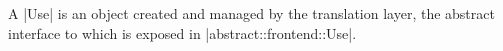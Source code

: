A |Use| is an object created and managed by the translation layer, the abstract interface to which
is exposed in |abstract::frontend::Use|.  


